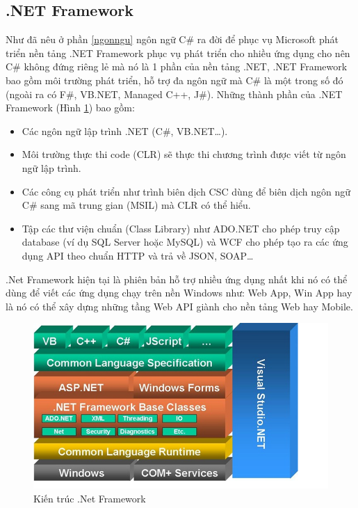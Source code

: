 \subsection{.NET Framework}
Như đã nêu ở phần \ref{ngonngu} ngôn ngữ C\# ra đời để phục vụ Microsoft phát triển nền tảng .NET Framework phục vụ phát triển cho nhiều ứng dụng cho nên C\# không đứng riêng lẻ mà nó là 1 phần của nền tảng .NET, .NET Framework bao gồm môi trường phát triển, hỗ trợ đa ngôn ngữ mà C\# là một trong số đó (ngoài ra có F\#, VB.NET, Managed C++, J\#).
Những thành phần của .NET Framework (Hình \ref{refhinh2_1}) bao gồm:
\begin{itemize}
\item Các ngôn ngữ lập trình .NET (C\#, VB.NET…).
\item Môi trường thực thi code (CLR) sẽ thực thi chương trình được viết từ ngôn ngữ lập trình.
\item Các công cụ phát triển như trình biên dịch CSC dùng để biên dịch ngôn ngữ C\# sang mã trung gian (MSIL) mà CLR có thể hiểu.
\item Tập các thư viện chuẩn (Class Library) như ADO.NET cho phép truy cập database (ví dụ SQL Server hoặc MySQL) và WCF cho phép tạo ra các ứng dụng API theo chuẩn HTTP và trả về JSON, SOAP…
\end{itemize}
\par
.Net Framework hiện tại là phiên bản hỗ trợ nhiều ứng dụng nhất khi nó có thể dùng để viết các ứng dụng chạy trên nền Windows như: Web App, Win App hay là nó có thể xây dựng những tầng Web API giành cho nền tảng Web hay Mobile.
\begin{center}
    \begin{figure}[h]
    \begin{center}
     \includegraphics[scale=0.6]{image/kienTrucDotNet.png}
    \end{center}
    \caption{Kiến trúc .Net Framework}
    \label{refhinh2_1}
    \end{figure}
\end{center}

